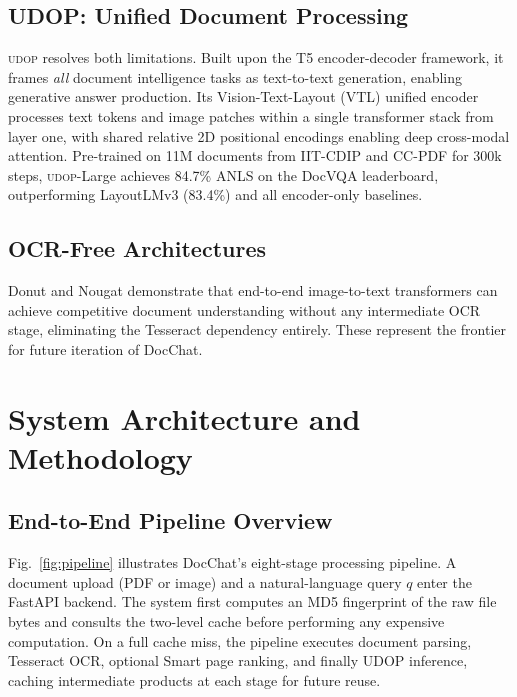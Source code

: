 \documentclass[conference]{IEEEtran}
\newcommand{\udop}{\textsc{udop}}
\begin{document}
\subsection{UDOP: Unified Document Processing}

\udop{} \cite{b_tang2023} resolves both limitations. Built upon the T5
encoder-decoder framework, it frames \emph{all} document intelligence tasks as
text-to-text generation, enabling generative answer production. Its
Vision-Text-Layout (VTL) unified encoder processes text tokens and image
patches within a single transformer stack from layer one, with shared relative
2D positional encodings enabling deep cross-modal attention. Pre-trained on 11M
documents from IIT-CDIP and CC-PDF for 300k steps, \udop-Large achieves 84.7\%
ANLS on the DocVQA leaderboard, outperforming LayoutLMv3 (83.4\%) and all
encoder-only baselines.

\subsection{OCR-Free Architectures}

Donut \cite{b_kim2022} and Nougat \cite{b_blecher2023} demonstrate that
end-to-end image-to-text transformers can achieve competitive document
understanding without any intermediate OCR stage, eliminating the
Tesseract dependency entirely. These represent the frontier for future
iteration of DocChat.

\section{System Architecture and Methodology}
\label{sec:methodology}

\subsection{End-to-End Pipeline Overview}
\label{subsec:pipeline}

Fig.~\ref{fig:pipeline} illustrates DocChat's eight-stage processing pipeline.
A document upload (PDF or image) and a natural-language query $q$ enter the
FastAPI backend. The system first computes an MD5 fingerprint of the raw file
bytes and consults the two-level cache before performing any expensive
computation. On a full cache miss, the pipeline executes document parsing,
Tesseract OCR, optional Smart page ranking, and finally UDOP inference,
caching intermediate products at each stage for future reuse.
\end{document}
